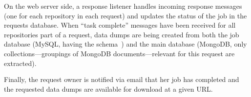 On the web server side, a response listener handles incoming response messages (one for each repository
in each request)  and updates the status of the job in the requests database.
When ``task complete'' messages have been received for all repositories part of a request, data dumps
are being created from both the job database (MySQL, having the \ght schema~\cite{gousios2013ghtorent})
and the main \ght database (MongoDB, only collections---groupings of MongoDB documents---relevant for this
request are extracted).

Finally, the request owner is notified via email that her job has completed and the requested data dumps
are available for download at a given URL.

